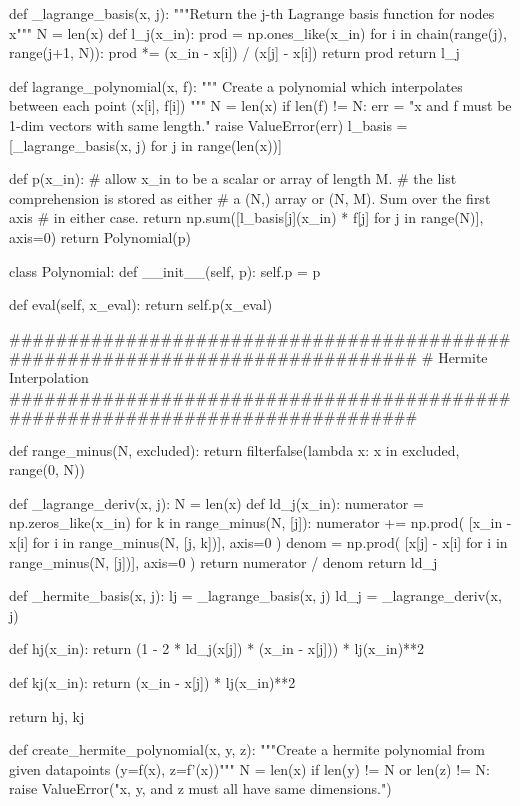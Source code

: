 \documentclass{homework}
\begin{document}
\begin{python}
def _lagrange_basis(x, j):
    """Return the j-th Lagrange basis function for nodes x"""
    N = len(x)
    def l_j(x_in):
        prod = np.ones_like(x_in)
        for i in chain(range(j), range(j+1, N)):
            prod *= (x_in - x[i]) / (x[j] - x[i])
        return prod
    return l_j


def lagrange_polynomial(x, f):
    """
    Create a polynomial which interpolates between each point (x[i], f[i])
    """
    N = len(x)
    if len(f) != N:
        err = "x and f must be 1-dim vectors with same length."
        raise ValueError(err)
    l_basis = [_lagrange_basis(x, j) for j in range(len(x))]

    def p(x_in):
        # allow x_in to be a scalar or array of length M.
        # the list comprehension is stored as either
        # a (N,) array or (N, M). Sum over the first axis
        # in either case.
        return np.sum([l_basis[j](x_in) * f[j]
                       for j in range(N)], axis=0)
    return Polynomial(p)


class Polynomial:
    def __init__(self, p):
        self.p = p

    def eval(self, x_eval):
        return self.p(x_eval)


##############################################################################
# Hermite Interpolation
##############################################################################

def range_minus(N, excluded):
    return filterfalse(lambda x: x in excluded, range(0, N))


def _lagrange_deriv(x, j):
    N = len(x)
    def ld_j(x_in):
        numerator = np.zeros_like(x_in)
        for k in range_minus(N, [j]):
            numerator += np.prod(
                [x_in - x[i] for i in range_minus(N, [j, k])],
                axis=0
            )
        denom = np.prod(
            [x[j] - x[i] for i in range_minus(N, [j])],
            axis=0
        )
        return numerator / denom
    return ld_j


def _hermite_basis(x, j):
    lj = _lagrange_basis(x, j)
    ld_j = _lagrange_deriv(x, j)

    def hj(x_in):
        return (1 - 2 * ld_j(x[j]) * (x_in - x[j])) * lj(x_in)**2

    def kj(x_in):
        return (x_in - x[j]) * lj(x_in)**2

    return hj, kj



def create_hermite_polynomial(x, y, z):
    """Create a hermite polynomial from given datapoints (y=f(x), z=f'(x))"""
    N = len(x)
    if len(y) != N or len(z) != N:
        raise ValueError("x, y, and z must all have same dimensions.")


\end{python}
\end{document}

